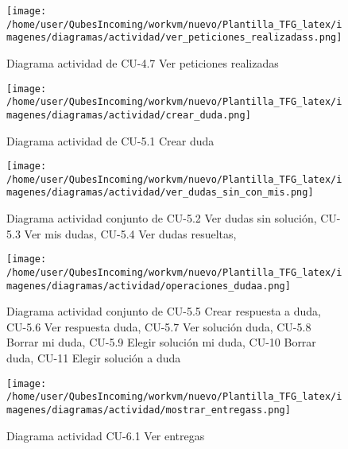         \begin{figure}[H] %
\centering
\texttt{[image: /home/user/QubesIncoming/workvm/nuevo/Plantilla\_TFG\_latex/imagenes/diagramas/actividad/ver\_peticiones\_realizadass.png]}  %

\caption{Diagrama actividad de CU-4.7 Ver peticiones realizadas}\label{figura147}
\end{figure}

        \begin{figure}[H] %
\centering
\texttt{[image: /home/user/QubesIncoming/workvm/nuevo/Plantilla\_TFG\_latex/imagenes/diagramas/actividad/crear\_duda.png]}  %

\caption{Diagrama actividad de CU-5.1 Crear duda}\label{figura148}
\end{figure}

        \begin{figure}[H] %
\centering
\texttt{[image: /home/user/QubesIncoming/workvm/nuevo/Plantilla\_TFG\_latex/imagenes/diagramas/actividad/ver\_dudas\_sin\_con\_mis.png]}  %

\caption{Diagrama actividad conjunto de CU-5.2 Ver dudas sin solución, CU-5.3 Ver mis dudas, CU-5.4 Ver dudas resueltas,}\label{figura1423}
\end{figure}


        \begin{figure}[H] %
\centering
\texttt{[image: /home/user/QubesIncoming/workvm/nuevo/Plantilla\_TFG\_latex/imagenes/diagramas/actividad/operaciones\_dudaa.png]}  %

\caption{Diagrama actividad conjunto de  CU-5.5 Crear respuesta a duda, CU-5.6 Ver respuesta duda, CU-5.7 Ver solución duda, CU-5.8 Borrar mi duda, CU-5.9 Elegir solución mi duda, CU-10 Borrar duda, CU-11 Elegir solución a duda}\label{figura151}
\end{figure}

        \begin{figure}[H] %
\centering
\texttt{[image: /home/user/QubesIncoming/workvm/nuevo/Plantilla\_TFG\_latex/imagenes/diagramas/actividad/mostrar\_entregass.png]}  %

\caption{Diagrama actividad CU-6.1 Ver entregas}\label{figura153}
\end{figure}

